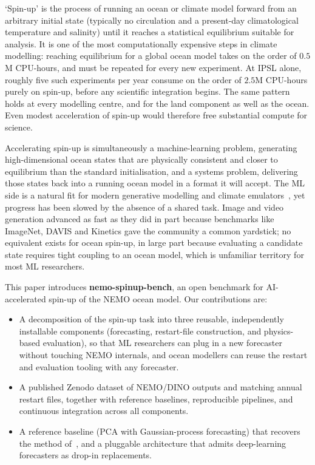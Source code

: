 \documentclass{article}
\begin{document}
`Spin-up' is the process of running an ocean or climate model forward
from an arbitrary initial state (typically no circulation and a
present-day climatological temperature and salinity) until it reaches a
statistical equilibrium suitable for analysis. It is one of the most
computationally expensive steps in climate modelling: reaching
equilibrium for a global ocean model takes on the order of $0.5$M
CPU-hours, and must be repeated for every new experiment. At IPSL
alone, roughly five such experiments per year consume on the order of
$2.5$M CPU-hours purely on spin-up, before any scientific integration
begins. The same pattern holds at every modelling centre, and for the
land component as well as the ocean. Even modest acceleration of
spin-up would therefore free substantial compute for science.

Accelerating spin-up is simultaneously a machine-learning problem,
generating high-dimensional ocean states that are physically
consistent and closer to equilibrium than the standard initialisation,
and a systems problem, delivering those states back into a running
ocean model in a format it will accept. The ML side is a natural fit
for modern generative modelling and climate
emulators~\citep{kochkov_neural_2024, dheeshjith_samudra_2025,
meunier_learning_2025, gorce_physically_2025}, yet progress has been
slowed by the absence of a shared task. Image and video generation
advanced as fast as they did in part because benchmarks like
ImageNet, DAVIS and Kinetics gave the community a common yardstick; no
equivalent exists for ocean spin-up, in large part because evaluating
a candidate state requires tight coupling to an ocean model, which
is unfamiliar territory for most ML researchers.

This paper introduces \textbf{nemo-spinup-bench}, an open benchmark
for AI-accelerated spin-up of the NEMO ocean model. Our contributions
are:

\begin{itemize}
  \item A decomposition of the spin-up task into three reusable,
    independently installable components (forecasting, restart-file
    construction, and physics-based evaluation), so that ML
    researchers can plug in a new forecaster without touching NEMO
    internals, and ocean modellers can reuse the restart and
    evaluation tooling with any forecaster.
  \item A published Zenodo dataset of NEMO/DINO outputs and matching
    annual restart files, together with reference
    baselines, reproducible pipelines, and continuous integration
    across all components.
  \item A reference baseline (PCA with Gaussian-process forecasting)
    that recovers the method of~\citet{gorce_physically_2025}, and a
    pluggable architecture that admits deep-learning forecasters as
    drop-in replacements.
\end{itemize}
\end{document}

